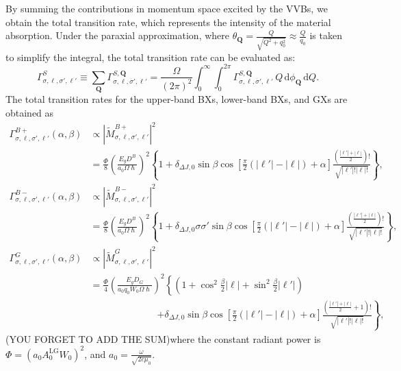 By summing the contributions in momentum space excited by the VVBs, we obtain the total transition rate, which represents the intensity of the material absorption. Under the paraxial approximation, where $\theta_{\boldsymbol{Q}} = \frac{Q}{\sqrt{Q^2+q_0^2}} \approx \frac{Q}{q_0}$ is taken to simplify the integral, the total transition rate can be evaluated as:
\[
\Gamma^{S}_{\sigma, \ell, \sigma', \ell'} 
\equiv 
\sum_{\boldsymbol{Q}} 
\Gamma^{S, \boldsymbol{Q}}_{\sigma, \ell, \sigma', \ell'} 
=
\frac{\Omega}{(2\pi)^2} 
\int_0^\infty \int_0^{2\pi} 
\Gamma^{S, \boldsymbol{Q}}_{\sigma, \ell, \sigma', \ell'} 
\, Q \, \mathrm{d}\phi_{\boldsymbol{Q}} \, \mathrm{d}Q.
\]
The total transition rates for the upper-band BXs, lower-band BXs, and GXs are obtained as
\begin{equation}
\begin{aligned}
\Gamma_{\sigma,\ell,\sigma',\ell'}^{B+}(\alpha,\beta)
&\propto \left|\tilde{M}_{\sigma,\ell,\sigma',\ell'}^{B+}\right|^2 \\
&= \frac{\Phi}{8} \left( \frac{E_g D^B}{a_0\Omega\hslash} \right)^2 
\left\{1+\delta_{\Delta J, 0}\sin\beta\cos\left[\frac{\pi}{2}(|\ell'|-|\ell|)+\alpha\right]\frac{\left(\frac{|\ell'|+|\ell|}{2}\right)!}{\sqrt{|\ell'|!|\ell|!}}\right\} , \\
\Gamma_{\sigma,\ell,\sigma',\ell'}^{B-}(\alpha,\beta) 
&\propto \left|\tilde{M}_{\sigma,\ell,\sigma',\ell'}^{B-}\right|^2 \\
&=\frac{\Phi}{8} \left( \frac{E_g D^B}{a_0\Omega\hslash} \right)^2 
\left\{1+\delta_{\Delta J, 0}\sigma\sigma'\sin\beta\cos\left[\frac{\pi}{2}(|\ell'|-|\ell|)+\alpha\right]\frac{\left(\frac{|\ell'|+|\ell|}{2}\right)!}{\sqrt{|\ell'|!|\ell|!}}\right\} , \\
\Gamma_{\sigma,\ell,\sigma',\ell'}^{G}(\alpha,\beta) 
&\propto \left|\tilde{M}_{\sigma,\ell,\sigma',\ell'}^{G}\right|^2 \\
&=\frac{\Phi}{4} \left( \frac{E_g D_G}{a_0 q_0 W_0\Omega\hslash} \right)^2 
\left\{\left(1+\cos^2\frac{\beta}{2}|\ell|+\sin^2\frac{\beta}{2}|\ell'|\right) \right. \\
&\hspace{7em} \left. + \delta_{\Delta J, 0}\sin\beta\cos\left[\frac{\pi}{2}(|\ell'|-|\ell|) +\alpha\right]\frac{\left(\frac{|\ell'|+|\ell|}{2}+1\right)!}{\sqrt{|\ell'|!|\ell|!}}\right\} ,
\end{aligned}
\label{total_transition_rate}
\end{equation}
(YOU FORGET TO ADD THE SUM)where the constant radiant power is $\Phi = (a_0 A_0^{\mathrm{LG}} W_0)^2$, and $a_0 = \frac{\omega}{\sqrt{2c\mu_0}}$.

